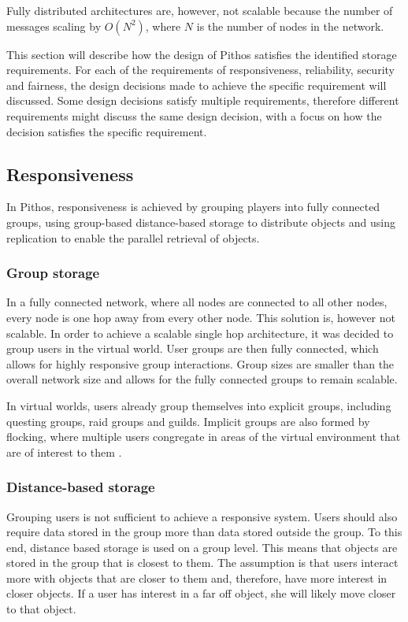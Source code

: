 Fully distributed architectures are, however, not scalable because the number of messages scaling by $O(N^2)$, where $N$ is the number of nodes in the network.

This section will describe how the design of Pithos satisfies the identified storage requirements. For each of the requirements of responsiveness, reliability, security and fairness, the design decisions made to achieve the specific requirement will discussed. Some design decisions satisfy multiple requirements, therefore different requirements might discuss the same design decision, with a focus on how the decision satisfies the specific requirement.

\subsection{Responsiveness}

In Pithos, responsiveness is achieved by grouping players into fully connected groups, using group-based distance-based storage to distribute objects and using replication to enable the parallel retrieval of objects.

\subsubsection{Group storage}

In a fully connected network, where all nodes are connected to all other nodes, every node is one hop away from every other node. This solution is, however not scalable. In order to achieve a scalable single hop architecture, it was decided to group users in the virtual world. User groups are then fully connected, which allows for highly responsive group interactions. Group sizes are smaller than the overall network size and allows for the fully connected groups to remain scalable.

In virtual worlds, users already group themselves into explicit groups, including questing groups, raid groups and guilds. Implicit groups are also formed by flocking, where multiple users congregate in areas of the virtual environment that are of interest to them \cite{flocking}.

\subsubsection{Distance-based storage}
Grouping users is not sufficient to achieve a responsive system. Users should also require data stored in the group more than data stored outside the group. To this end, distance based storage is used on a group level. This means that objects are stored in the group that is closest to them. The assumption is that users interact more with objects that are closer to them and, therefore, have more interest in closer objects. If a user has interest in a far off object, she will likely move closer to that object.

